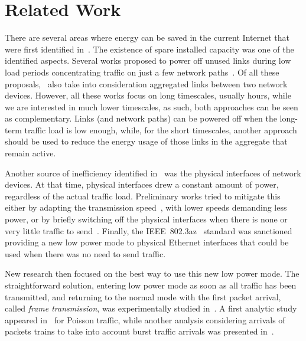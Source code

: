 \documentclass[journal,english,twocolumn,10pt,letterpaper]{IEEEtran}
\newcommand{\added}[1]{{#1}}
\begin{document}
\added{
  \section{Related Work}
  \label{sec:related-work}
  
  There are several areas where energy can be saved in the current Internet
  that were first identified in~\cite{gupta03:_green_of_inter}. The existence
  of spare installed capacity was one of the identified aspects. Several works
  proposed to power off unused links during low load periods concentrating
  traffic on just a few network
  paths~\cite{chiaraviglio12:_minim_isp_networ_energ_cost,addis14:_energ_manag_throug_optim_routin,garroppo11:_energ_aware_routin_based_energ_charac_devic,garroppo13:_does_traff_consol_alway_lead,galan2013:_using}.
  Of all these
  proposals,~\cite{garroppo11:_energ_aware_routin_based_energ_charac_devic,garroppo13:_does_traff_consol_alway_lead}
  also take into consideration aggregated links between two network devices.
  However, all these works focus on long timescales, usually hours, while we
  are interested in much lower timescales, as such, both approaches can be
  seen as complementary. Links (and network paths) can be powered off when the
  long-term traffic load is low enough, while, for the short timescales,
  another approach should be used to reduce the energy usage of those links in
  the aggregate that remain active.

  Another source of inefficiency identified in~\cite{gupta03:_green_of_inter}
  was the physical interfaces of network devices. At that time, physical
  interfaces drew a constant amount of power, regardless of the actual traffic
  load. Preliminary works tried to mitigate this either by adapting the
  transmission speed~\cite{gunaratne08:_reduc_energ_consum_ether_adapt}, with
  lower speeds demanding less power, or by briefly switching off the physical
  interfaces when there is none or very little traffic to
  send~\cite{gupta07:_using_low_power_modes_for,rodriguez09:_improv_oppor_sleep_algor_lan_switc}.
  Finally, the IEEE~802.3az~\cite{802.3az} standard was sanctioned providing a
  new low power mode to physical Ethernet interfaces that could be used when
  there was no need to send traffic. 

  New research then focused on the best way to use this new low power mode.
  The straightforward solution, entering low power mode as soon as all traffic
  has been transmitted, and returning to the normal mode with the first packet
  arrival, called \emph{frame transmission}, was experimentally studied
  in~\cite{reviriego11:_initial_evaluat_energ_effic_ether}. A first analytic
  study appeared in~\cite{larrabeiti11:_towar_gb_ether} for Poisson traffic,
  while another analysis considering arrivals of packets trains to take into
  account burst traffic arrivals was presented
  in~\cite{marsan11:_simpl_analy_model_energ_effic_ether}.

}
\end{document}
